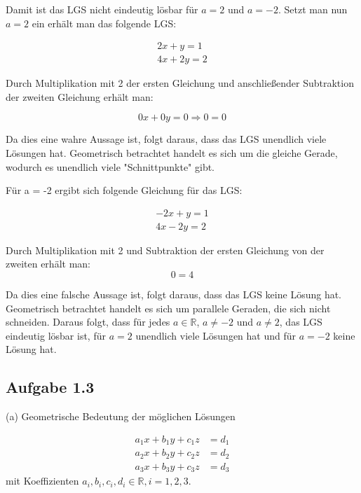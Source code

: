 \documentclass[11pt]{article}
\begin{document}
    Damit ist das LGS nicht eindeutig lösbar für $a = 2$ und $a = -2$. Setzt man nun $a = 2$ ein erhält man das folgende LGS:

    \[
    \begin{aligned}
        2x + y = 1 \\
        4x + 2y = 2
    \end{aligned}
    \]

    Durch Multiplikation mit 2 der ersten Gleichung und anschließender Subtraktion der zweiten Gleichung erhält man:

    \[
        0x + 0y = 0 \Rightarrow 0 = 0
    \]

    Da dies eine wahre Aussage ist, folgt daraus, dass das LGS unendlich viele Lösungen hat.
    Geometrisch betrachtet handelt es sich um die gleiche Gerade, wodurch es unendlich viele "Schnittpunkte" gibt.

    Für a = -2 ergibt sich folgende Gleichung für das LGS:

    \[
    \begin{aligned}
        -2x + y = 1 \\
        4x-2y = 2
    \end{aligned}
    \]

    Durch Multiplikation mit 2 und Subtraktion der ersten Gleichung von der zweiten erhält man:
    \[
        0 = 4
    \]

    Da dies eine falsche Aussage ist, folgt daraus, dass das LGS keine Lösung hat.
    Geometrisch betrachtet handelt es sich um parallele Geraden, die sich nicht schneiden.
    Daraus folgt, dass für jedes $a \in \mathbb{R}$, $a \neq -2$ und $a \neq 2$, das LGS eindeutig lösbar ist, für $a = 2$ unendlich viele Lösungen hat und für $a = -2$ keine Lösung hat.


    \subsection{Aufgabe 1.3}

    (a) Geometrische Bedeutung der möglichen Lösungen

    \[
    \begin{aligned}
        a_1x + b_1y + c_1z & = d_1 \\
        a_2x + b_2y + c_2z & = d_2 \\
        a_3x + b_3y + c_3z & = d_3
    \end{aligned}
    \]
    mit Koeffizienten $a_i, b_i, c_i, d_i \in \mathbb{R}, i = 1, 2, 3$.
    \bigskip
\end{document}
